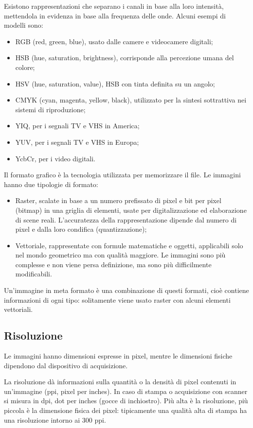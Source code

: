 Esistono rappresentazioni che separano i canali in base alla loro intensità, mettendola in evidenza in base alla frequenza delle onde. Alcuni esempi di modelli sono:
\begin{itemize}
	\item RGB (red, green, blue), usato dalle camere e videocamere digitali;
	\item HSB (hue, saturation, brightness), corrisponde alla percezione umana del colore;
	\item HSV (hue, saturation, value), HSB con tinta definita su un angolo;
	\item CMYK (cyan, magenta, yellow, black), utilizzato per la sintesi sottrattiva nei sistemi di riproduzione;
	\item YIQ, per i segnali TV e VHS in America;
	\item YUV, per i segnali TV e VHS in Europa;
	\item YcbCr, per i video digitali.
\end{itemize}

Il formato grafico è la tecnologia utilizzata per memorizzare il file. Le immagini hanno due tipologie di formato: 
\begin{itemize}
	\item Raster, scalate in base a un numero prefissato di pixel e bit per pixel (bitmap) in una griglia di elementi, usate per digitalizzazione ed elaborazione di scene reali. L'accuratezza della rappresentazione dipende dal numero di pixel e dalla loro condifica (quantizzazione);
	\item Vettoriale, rappresentate con formule matematiche e oggetti, applicabili solo nel mondo geometrico ma con qualità maggiore. Le immagini sono più complesse e non viene persa definizione, ma sono più difficilmente modificabili.
\end{itemize}
Un'immagine in meta formato è una combinazione di questi formati, cioè contiene informazioni di ogni tipo: solitamente viene usato raster con alcuni elementi vettoriali.

\subsection{Risoluzione}
Le immagini hanno dimensioni espresse in pixel, mentre le dimensioni fisiche dipendono dal dispositivo di acquisizione. 

La risoluzione dà informazioni sulla quantità o la densità di pixel contenuti in un'immagine (ppi, pixel per inches). In caso di stampa o acquisizione con scanner si misura in dpi, dot per inches (gocce di inchiostro). Più alta è la risoluzione, più piccola è la dimensione fisica dei pixel: tipicamente una qualità alta di stampa ha una risoluzione intorno ai 300 ppi.

